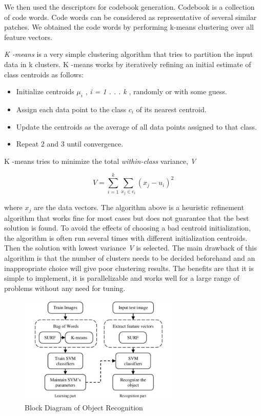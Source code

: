 \documentclass[journal,twoside]{IEEEtran}
\begin{document}
    We then used the descriptors for codebook generation.
    Codebook is a collection of code words. Code words can be
    considered as representative of several similar patches. \cite{Minichino2015} We
    obtained the code words by performing k-means clustering
    over all feature vectors.

    \textit{K -means} is a very simple clustering algorithm that tries to
    partition the input data in k clusters. K -means works by
    iteratively refining an initial estimate of class centroids as
    follows:
    \begin{itemize}
        \item Initialize centroids \(\mu_i\) , \textit{i = 1 . . . k} , randomly or with some guess.
        \item Assign each data point to the class \(c_i\) of its nearest centroid.
    \item Update the centroids as the average of all data points assigned to that class.
    \item Repeat 2 and 3 until convergence.
\end{itemize}
K -means tries to minimize the total \textit{within-class} variance, \textit{V}

\begin{equation}
    V = \displaystyle\sum_{i=1}^{k}\sum_{x_j \in c_i}(x_j - u_i)^2
\end{equation}

where \(x_j\) are the data vectors. The algorithm above is a
heuristic refinement algorithm that works fine for most cases
but does not guarantee that the best solution is found. To avoid
the effects of choosing a bad centroid initialization, the
algorithm is often run several times with different
initialization centroids. Then the solution with lowest variance
\textit{V} is selected. The main drawback of this algorithm is that the
number of clusters needs to be decided beforehand and an
inappropriate choice will give poor clustering results. The
benefits are that it is simple to implement, it is parallelizable
and works well for a large range of problems without any need
for tuning. \cite{Alpaydin2010}

\begin{figure}[htb]
\centering
\includegraphics[width=3.0in]{figure2}
\caption{Block Diagram of Object Recognition}
\label{fig:figure2}
\end{figure}
\end{document}

